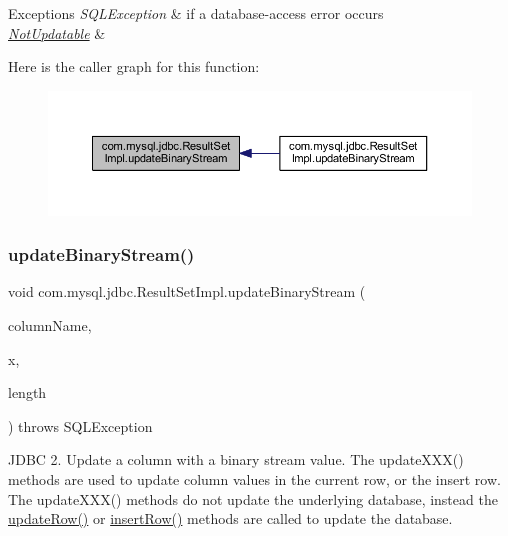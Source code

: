 \begin{DoxyExceptions}{Exceptions}
{\em S\+Q\+L\+Exception} & if a database-\/access error occurs \\
\hline
{\em \mbox{\hyperlink{classcom_1_1mysql_1_1jdbc_1_1_not_updatable}{Not\+Updatable}}} & \\
\hline
\end{DoxyExceptions}
Here is the caller graph for this function\+:
\nopagebreak
\begin{figure}[H]
\begin{center}
\leavevmode
\includegraphics[width=350pt]{classcom_1_1mysql_1_1jdbc_1_1_result_set_impl_a89ab2f792bec03ec7dc3bbb925aa1239_icgraph}
\end{center}
\end{figure}
\mbox{\label{classcom_1_1mysql_1_1jdbc_1_1_result_set_impl_a765e098c773712037e65934873f8af01}} 
\subsubsection{\texorpdfstring{update\+Binary\+Stream()}{updateBinaryStream()}\hspace{0.1cm}{\footnotesize\ttfamily [2/2]}}
{\footnotesize\ttfamily void com.\+mysql.\+jdbc.\+Result\+Set\+Impl.\+update\+Binary\+Stream (\begin{DoxyParamCaption}\item[{String}]{column\+Name,  }\item[{java.\+io.\+Input\+Stream}]{x,  }\item[{int}]{length }\end{DoxyParamCaption}) throws S\+Q\+L\+Exception}

J\+D\+BC 2. Update a column with a binary stream value. The update\+X\+X\+X() methods are used to update column values in the current row, or the insert row. The update\+X\+X\+X() methods do not update the underlying database, instead the \mbox{\hyperlink{classcom_1_1mysql_1_1jdbc_1_1_result_set_impl_a2842d32292d023aaeeafedeed3322981}{update\+Row()}} or \mbox{\hyperlink{classcom_1_1mysql_1_1jdbc_1_1_result_set_impl_a78e304e3279cbcf60392f18c1385e3bf}{insert\+Row()}} methods are called to update the database.


